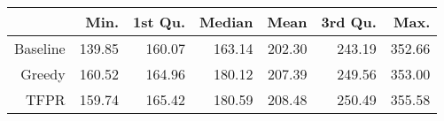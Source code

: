 \begin{table}[ht]
\centering
\begin{tabular}{rrrrrrr}
  \hline
 & Min. & 1st Qu. & Median & Mean & 3rd Qu. & Max. \\ 
  \hline
Baseline & 139.85 & 160.07 & 163.14 & 202.30 & 243.19 & 352.66 \\ 
  Greedy & 160.52 & 164.96 & 180.12 & 207.39 & 249.56 & 353.00 \\ 
  TFPR & 159.74 & 165.42 & 180.59 & 208.48 & 250.49 & 355.58 \\ 
   \hline
\end{tabular}
\end{table}
